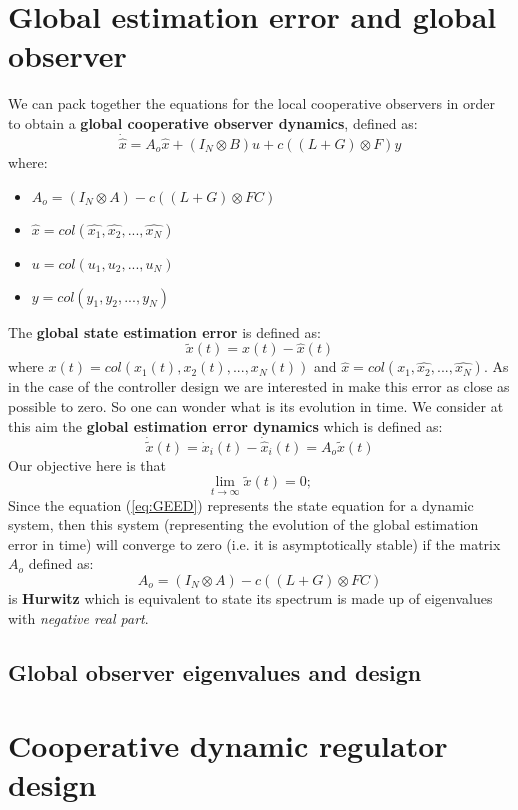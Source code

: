 \section{Global estimation error and global observer}
We can pack together the equations for the local cooperative observers in order to obtain a \textbf{global cooperative observer dynamics}, defined as:
\begin{equation}
    \dot{\hat{x}}= A_o\hat{x} + 
    (I_N \otimes B) u + c ((L+G)\otimes F) y
\end{equation}
where:
\begin{itemize}
    \item $A_o= (I_N \otimes A) - c ((L+G)\otimes FC)$
    \item $\hat{x} = col(\hat{x_1}, \hat{x_2}, ..., \hat{x_N})$
    \item $u=col(u_1, u_2, ..., u_N)$
    \item $y=col(y_1,y_2, ..., y_N)$
\end{itemize}
\noindent
The \textbf{global state estimation error} is defined as: 
\begin{equation}
    \tilde{x}(t) = x(t)-\hat{x}(t)
\end{equation}
where $x(t) = col(x_1(t), x_2(t), ..., x_N(t))$ and $\hat{x} = col(\hat{x_1}, \hat{x_2}, ..., \hat{x_N})$. 
As in the case of the controller design we are interested in make this error as close as possible to zero. So one can wonder what is its evolution in time. We consider at this aim the \textbf{global estimation error dynamics} which is defined as: 
\begin{equation}  \label{eq:GEED}
    \dot{\tilde{x}}(t) = \dot{x}_i(t) - \dot{\hat{x}}_i(t) = A_o \tilde{x}(t)
\end{equation}
Our objective here is that
\begin{equation}
    \lim_{t\to\infty} \tilde{x}(t) = 0; 
\end{equation}
Since the equation (\ref{eq:GEED}) represents the state equation for a dynamic system, then this system (representing the evolution of the global estimation error in time) will converge to zero (i.e. it is asymptotically stable) if the matrix $A_o$ defined as:
\begin{equation}
    A_o=(I_N \otimes A) - c ((L+G)\otimes FC)
\end{equation} 
is \textbf{Hurwitz} which is equivalent to state its spectrum is made up of eigenvalues with \textit{negative real part}.

\subsection{Global observer eigenvalues and design}

\section{Cooperative dynamic regulator design}


